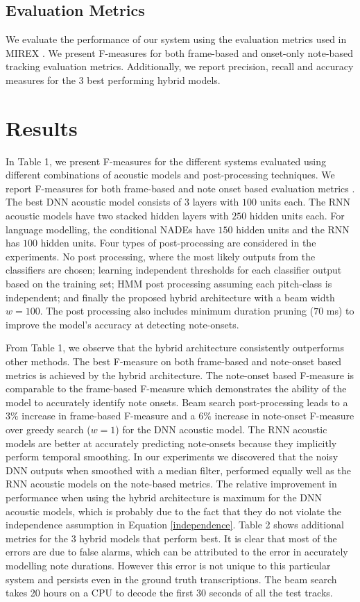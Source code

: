 \documentclass{article}
\begin{document}
\subsection{Evaluation Metrics}

We evaluate the performance of our system using the evaluation metrics used in MIREX \cite{bay2009evaluation}. We present F-measures for both frame-based and onset-only note-based tracking evaluation metrics. Additionally, we report precision, recall and accuracy measures for the 3 best performing hybrid models.

\section{Results}
In Table 1, we present F-measures for the different systems evaluated using different combinations of acoustic models and post-processing techniques. We report F-measures for both frame-based and note onset based evaluation metrics \cite{bay2009evaluation}. The best DNN acoustic model consists of $3$ layers with $100$ units each. The RNN acoustic models have two stacked hidden layers with $250$ hidden units each. For language modelling, the conditional NADEs have $150$ hidden units and the RNN has $100$ hidden units. Four types of post-processing are considered in the experiments. No post processing, where the most likely outputs from the classifiers are chosen; learning independent thresholds for each classifier output based on the training set; HMM post processing assuming each pitch-class is independent; and finally the proposed hybrid architecture with a beam width $w = 100$. The post processing also includes minimum duration pruning ($70$ ms) to improve the model's accuracy at detecting note-onsets. 

From Table 1, we observe that the hybrid architecture consistently outperforms other methods. The best F-measure on both frame-based and note-onset based metrics is achieved by the hybrid architecture. The note-onset based F-measure is comparable to the frame-based F-measure which demonstrates the ability of the model to accurately identify note onsets. Beam search post-processing leads to a $3\%$ increase in frame-based F-measure and a $6\%$ increase in note-onset F-measure over greedy search ($w = 1$) for the DNN acoustic model. The RNN acoustic models are better at accurately predicting note-onsets because they implicitly perform temporal smoothing. In our experiments we discovered that the noisy DNN outputs when smoothed with a median filter, performed equally well as the RNN acoustic models on the note-based metrics. The relative improvement in performance when using the hybrid architecture is maximum for the DNN acoustic models, which is probably due to the fact that they do not violate the independence assumption in Equation \ref{independence}.  Table 2 shows additional metrics for the 3 hybrid models that perform best. It is clear that most of the errors are due to false alarms, which can be attributed to the error in accurately modelling note durations. However this error is not unique to this particular system and persists even in the ground truth transcriptions. The beam search takes 20 hours on a CPU to decode the first 30 seconds of all the test tracks. 
\end{document}
